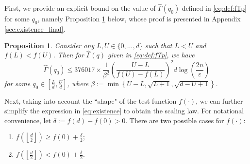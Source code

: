 \documentclass[onecolumn,letterpaper]{IEEEtran}
\newtheorem{proposition}{Proposition}
\newcommand{\cp}{{q}}
\newcommand{\cpn}{{\cp^*}}
\newcommand{\up}{{U}}
\newcommand{\lw}{{L}}
\newcommand{\fgap}{{\delta}}
\newcommand{\bet}{{\beta}}
\newcommand{\exifinal}{{ 376017 \times \frac{1}{\bet^2} \left( \frac{\up-\lw}{f(\up)-f(\lw)} \right)^2  d\log \left( \frac{2n}{\varepsilon } \right)}}
\newcommand{\ftau}{{\Gamma}}
\newcommand{\ftaup}{{\hat{\Gamma}}}
\newcommand{\fTp}{\ftaup (\cp)}
\newcommand{\fTn}{\ftau (\cpn)}
\newcommand{\cpns}{\cp_0}
\newcommand{\fTpns}{\ftaup (\cpns)}
\newcommand{\ups}{{\upsilon}}
\begin{document}



\iffalse
First, we provide an explicit bound on the value of $\fTpns$ defined in \eqref{eq:def:fTp} for some $\cpns$, namely Proposition \ref{prop:existence_final} below, whose proof is presented in Appendix \ref{sec:existence_final}. 
\begin{proposition}
\label{prop:existence_final}
Consider any $\lw,\up \in \{0,\dots, d\}$ such that $\lw < \up$ and $f(\lw)<f(\up)$. %
Then for $\fTp$ given in \eqref{eq:def:fTp}, we have
\begin{equation} 
\label{eq:existence}
\fTpns \leq \exifinal
\end{equation} 
for some $\cpns \in \left[\frac {\lw} {d}, \frac {\up} {d}\right]$, where $\bet := \min \left\{ \up-\lw , \sqrt{\lw+1} , \sqrt{d-\up+1} \right\}$.
\end{proposition}



Next, taking into account the ``shape" of the test function $f(\cdot)$, we can further simplify the expression in \eqref{eq:existence} to obtain the scaling law. For notational convenience, let $\fgap:=f(d)-f(0)>0$. There are two possible cases for $f(\cdot)$: 
\begin{enumerate}[label=\roman*)]
    \item $f\left(\left\lfloor \frac {d} {2}\right \rfloor\right)\geq f(0)+\frac {\fgap}{2}$; \label{f:item:type1}
    \item $f\left(\left\lfloor \frac {d} {2}\right \rfloor\right) < f(0)+\frac {\fgap}{2}$.   \label{f:item:type2}
\end{enumerate}
\end{document}
